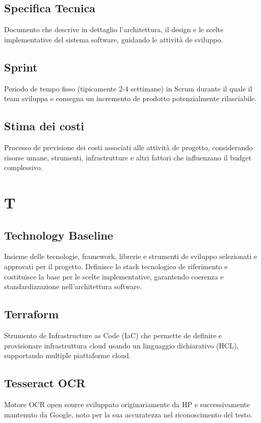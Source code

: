 \documentclass[a4paper,11pt]{article}
\begin{document}
\subsection{Specifica Tecnica}
Documento che descrive in dettaglio l'architettura, il design e le scelte implementative del sistema software, guidando le attività de sviluppo.

\subsection{Sprint}
Periodo de tempo fisso (tipicamente 2-4 settimane) in Scrum durante il quale il team sviluppa e consegna un incremento de prodotto potenzialmente rilasciabile.

\subsection{Stima dei costi}
Processo de previsione dei costi associati alle attività de progetto, considerando risorse umane, strumenti, infrastrutture e altri fattori che influenzano il budget complessivo.

\newpage
\section{T}

\subsection{Technology Baseline}
Insieme delle tecnologie, framework, librerie e strumenti de sviluppo selezionati e approvati per il progetto. Definisce lo stack tecnologico de riferimento e costituisce la base per le scelte implementative, garantendo coerenza e standardizzazione nell'architettura software.

\subsection{Terraform}
Strumento de Infrastructure as Code (IaC) che permette de definire e provisionare infrastruttura cloud usando un linguaggio dichiarativo (HCL), supportando multiple piattaforme cloud.

\subsection{Tesseract OCR}
Motore OCR open source sviluppato originariamente da HP e successivamente mantenuto da Google, noto per la sua accuratezza nel riconoscimento del testo.
\end{document}
